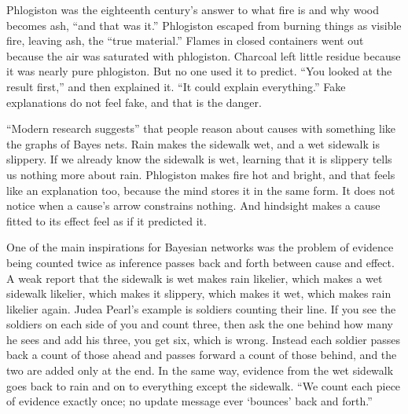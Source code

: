 
Phlogiston was the eighteenth century's answer to what fire is and why wood becomes ash, ``and that was it.'' Phlogiston escaped from burning things as visible fire, leaving ash, the ``true material.'' Flames in closed containers went out because the air was saturated with phlogiston. Charcoal left little residue because it was nearly pure phlogiston. But no one used it to predict. ``You looked at the result first,'' and then explained it. ``It could explain everything.''  Fake explanations do not feel fake, and that is the danger.

``Modern research suggests'' that people reason about causes with something like the graphs of Bayes nets.  Rain makes the sidewalk wet, and a wet sidewalk is slippery. If we already know the sidewalk is wet, learning that it is slippery tells us nothing more about rain. Phlogiston makes fire hot and bright, and that feels like an explanation too, because the mind stores it in the same form. It does not notice when a cause's arrow constrains nothing. And hindsight makes a cause fitted to its effect feel as if it predicted it.

One of the main inspirations for Bayesian networks was the problem of evidence being counted twice as inference passes back and forth between cause and effect. A weak report that the sidewalk is wet makes rain likelier, which makes a wet sidewalk likelier, which makes it slippery, which makes it wet, which makes rain likelier again. Judea Pearl's example is soldiers counting their line. If you see the soldiers on each side of you and count three, then ask the one behind how many he sees and add his three, you get six, which is wrong. Instead each soldier passes back a count of those ahead and passes forward a count of those behind, and the two are added only at the end. In the same way, evidence from the wet sidewalk goes back to rain and on to everything except the sidewalk. ``We count each piece of evidence exactly once; no update message ever `bounces' back and forth.'' 

